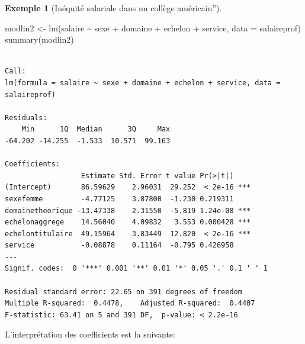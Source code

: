 \documentclass[
  11pt,
  letterpaper,
]{scrbook}
\newenvironment{Shaded}{\begin{snugshade}}{\end{snugshade}}
\newcommand{\AttributeTok}[1]{\textcolor[rgb]{0.40,0.45,0.13}{#1}}
\newcommand{\FunctionTok}[1]{\textcolor[rgb]{0.28,0.35,0.67}{#1}}
\newcommand{\NormalTok}[1]{\textcolor[rgb]{0.00,0.23,0.31}{#1}}
\newcommand{\OtherTok}[1]{\textcolor[rgb]{0.00,0.23,0.31}{#1}}
\newcommand{\SpecialCharTok}[1]{\textcolor[rgb]{0.37,0.37,0.37}{#1}}
\theoremstyle{definition}
\newtheorem{example}{Exemple}[chapter]
\theoremstyle{remark}
\begin{document}
\begin{example}[Inéquité salariale dans un collège
américain'']
\begin{longtable}[]
\end{longtable}

\begin{Shaded}
\begin{Highlighting}[]
\NormalTok{modlin2 }\OtherTok{\textless{}{-}} \FunctionTok{lm}\NormalTok{(salaire }\SpecialCharTok{\textasciitilde{}}\NormalTok{  sexe }\SpecialCharTok{+}\NormalTok{ domaine }\SpecialCharTok{+}\NormalTok{ echelon }\SpecialCharTok{+}\NormalTok{ service,}
              \AttributeTok{data =}\NormalTok{ salaireprof)}
\FunctionTok{summary}\NormalTok{(modlin2)}
\end{Highlighting}
\end{Shaded}

\begin{verbatim}

Call:
lm(formula = salaire ~ sexe + domaine + echelon + service, data = salaireprof)

Residuals:
    Min      1Q  Median      3Q     Max 
-64.202 -14.255  -1.533  10.571  99.163 

Coefficients:
                  Estimate Std. Error t value Pr(>|t|)    
(Intercept)       86.59629    2.96031  29.252  < 2e-16 ***
sexefemme         -4.77125    3.87800  -1.230 0.219311    
domainetheorique -13.47338    2.31550  -5.819 1.24e-08 ***
echelonaggrege    14.56040    4.09832   3.553 0.000428 ***
echelontitulaire  49.15964    3.83449  12.820  < 2e-16 ***
service           -0.08878    0.11164  -0.795 0.426958    
---
Signif. codes:  0 '***' 0.001 '**' 0.01 '*' 0.05 '.' 0.1 ' ' 1

Residual standard error: 22.65 on 391 degrees of freedom
Multiple R-squared:  0.4478,    Adjusted R-squared:  0.4407 
F-statistic: 63.41 on 5 and 391 DF,  p-value: < 2.2e-16
\end{verbatim}

L'interprétation des coefficients est la suivante:


\end{example}
\end{document}
